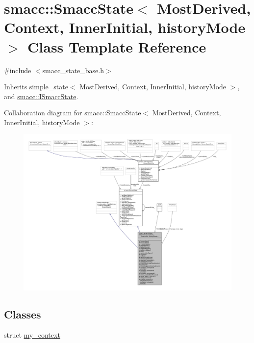 \hypertarget{classsmacc_1_1SmaccState}{}\section{smacc\+:\+:Smacc\+State$<$ Most\+Derived, Context, Inner\+Initial, history\+Mode $>$ Class Template Reference}
\label{classsmacc_1_1SmaccState}


{\ttfamily \#include $<$smacc\+\_\+state\+\_\+base.\+h$>$}



Inherits simple\+\_\+state$<$ Most\+Derived, Context, Inner\+Initial, history\+Mode $>$, and \hyperlink{classsmacc_1_1ISmaccState}{smacc\+::\+I\+Smacc\+State}.



Collaboration diagram for smacc\+:\+:Smacc\+State$<$ Most\+Derived, Context, Inner\+Initial, history\+Mode $>$\+:
\nopagebreak
\begin{figure}[H]
\begin{center}
\leavevmode
\includegraphics[width=350pt]{classsmacc_1_1SmaccState__coll__graph}
\end{center}
\end{figure}
\subsection*{Classes}
\begin{DoxyCompactItemize}
\item 
struct \hyperlink{structsmacc_1_1SmaccState_1_1my__context}{my\+\_\+context}
\end{DoxyCompactItemize}
